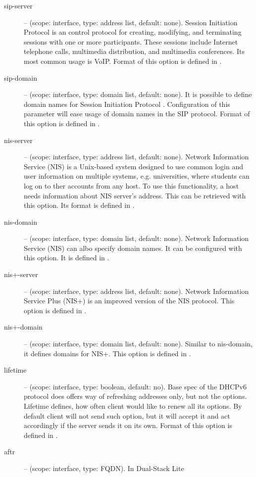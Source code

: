 \begin{description}
 \item[sip-server] -- (scope: interface, type: address list, default:
   none). Session Initiation Protocol \cite{rfc3263} is an control
   protocol for creating, modifying, and terminating sessions with one
   or more participants. These sessions include Internet telephone
   calls, multimedia distribution, and multimedia conferences. Its
   most common usage is VoIP. Format of this option is defined in
   \cite{rfc3319}.
 \item[sip-domain] -- (scope: interface, type: domain list, default:
   none). It is possible to define domain names for Session Initiation
   Protocol \cite{rfc3263}. Configuration of this parameter will ease
   usage of domain names in the SIP protocol. Format of this option is
   defined in \cite{rfc3319}.
 \item[nis-server] -- (scope: interface, type: address list, default:
   none). Network Information Service (NIS) is a Unix-based system
   designed to use common login and user information on multiple
   systems, e.g. universities, where students can log on to ther
   accounts from any host. To use this functionality, a host needs
   information about NIS server's address. This can be retrieved with
   this option. Its format is defined in \cite{rfc3898}.
 \item[nis-domain] -- (scope: interface, type: domain list, default:
   none). Network Information Service (NIS) can albo specify domain
   names. It can be configured with this option. It is defined in
   \cite{rfc3898}.
 \item[nis+-server] -- (scope: interface, type: address list, default:
   none). Network Information Service Plus (NIS+) is an improved
   version of the NIS protocol. This option is defined in
   \cite{rfc3898}.
 \item[nis+-domain] -- (scope: interface, type: domain list, default:
   none). Similar to nis-domain, it defines domains for NIS+. This
   option is defined in \cite{rfc3898}.
 \item[lifetime] -- (scope: interface, type: boolean, default:
   no). Base spec of the DHCPv6 protocol does offers way of refreshing
   addresses only, but not the options. Lifetime defines, how often
   client would like to renew all its options. By default client will
   not send such option, but it will accept it and act accordingly if
   the server sends it on its own. Format of this option is defined in
   \cite{rfc4242}.
 \item[aftr] -- (scope: interface, type: FQDN). In Dual-Stack Lite

\end{description}
